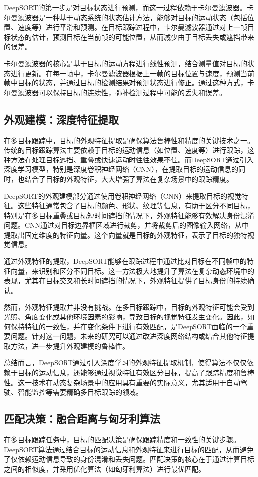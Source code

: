 DeepSORT的第一步是对目标状态进行预测，而这一过程依赖于卡尔曼滤波器。卡尔曼滤波器是一种基于动态系统的状态估计方法，能够对目标的运动状态（包括位置、速度等）进行平滑和预测。在目标跟踪过程中，卡尔曼滤波器通过对上一帧目标状态的估计，预测目标在当前帧的可能位置，从而减少由于目标丢失或遮挡带来的误差。

卡尔曼滤波器的核心是基于目标的运动方程进行线性预测，结合测量值对目标的状态进行更新。在每一帧中，卡尔曼滤波器根据上一帧的目标位置与速度，预测当前帧中目标的状态，并通过目标的检测结果对预测状态进行修正。通过这种方式，卡尔曼滤波器可以保持目标的连续性，弥补检测过程中可能的丢失和误差。

\subsection{外观建模：深度特征提取}
在多目标跟踪中，目标的外观特征提取是确保算法鲁棒性和精度的关键技术之一。传统的目标跟踪算法主要依赖于目标的运动信息（如位置、速度等）进行跟踪，这种方法在处理目标遮挡、重叠或快速运动时往往效果不佳。而DeepSORT通过引入深度学习模型，特别是深度卷积神经网络（CNN），在提取目标的运动信息的同时，也结合了目标的外观特征，大大增强了算法在复杂场景中的跟踪精度。

DeepSORT的外观建模部分通过使用卷积神经网络（CNN）来提取目标的视觉特征。这些特征通常包含了目标的颜色、形状、纹理等信息，有助于区分不同目标，特别是在多目标重叠或目标短时间遮挡的情况下，外观特征能够有效解决身份混淆问题。CNN通过对目标边界框区域进行裁剪，并将裁剪后的图像输入网络，从中提取出固定维度的特征向量。这个向量就是目标的外观特征，表示了目标的独特视觉信息。

通过外观特征的提取，DeepSORT能够在跟踪过程中通过比对目标在不同帧中的特征向量，来识别和区分不同目标。这一方法极大地提升了算法在复杂动态环境中的表现，尤其在目标交叉和长时间遮挡的情况下，外观特征提供了目标身份的持续确认。

然而，外观特征提取并非没有挑战。在多目标跟踪中，目标的外观特征可能会受到光照、角度变化或其他环境因素的影响，导致目标的视觉特征发生变化。因此，如何保持特征的一致性，并在变化条件下进行有效匹配，是DeepSORT面临的一个重要问题。针对这一问题，未来的研究可以通过改进深度网络结构或结合其他特征提取方法，进一步提升外观建模的鲁棒性。

总结而言，DeepSORT通过引入深度学习的外观特征提取机制，使得算法不仅仅依赖于目标的运动信息，还能够通过视觉特征有效区分目标，提高了跟踪精度和鲁棒性。这一技术在动态复杂场景中的应用具有重要的实际意义，尤其适用于自动驾驶、智能监控等需要精确多目标跟踪的领域。

\subsection{匹配决策：融合距离与匈牙利算法}
在多目标跟踪任务中，目标的匹配决策是确保跟踪精度和一致性的关键步骤。DeepSORT算法通过结合目标的运动信息和外观特征来进行目标的匹配，从而避免了仅依赖运动信息导致的身份混淆和丢失问题。匹配决策的核心在于通过计算目标之间的相似度，并采用优化算法（如匈牙利算法）进行最优匹配。

